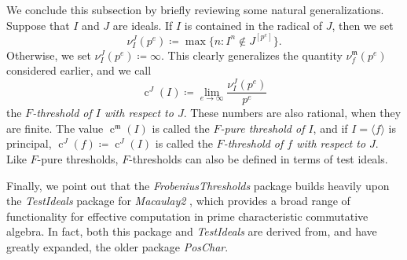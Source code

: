 \documentclass{amsart}
\newcommand{\ft}{\operatorname{c}}
\newcommand{\idealm}{\mathfrak{m}}
\begin{document}
We conclude this subsection by briefly reviewing some natural generalizations.  Suppose that $I$ and $J$ are ideals.  If $I$ is contained in the radical of $J$, then we set
%
\[ \nu_I^J(p^e) \coloneqq \max \{ n : I^n \notin J^{[p^e]} \}. \]
Otherwise, we set $\nu_I^J(p^e) \coloneqq \infty$.
This clearly generalizes the quantity $\nu_f^{\idealm}(p^e)$ considered earlier, and we call
\[ \ft^J(I) \coloneqq  \lim_{e \to \infty} \frac{ \nu_I^J(p^e)}{p^e} \]
the \emph{$F$-threshold of $I$ with respect to $J$}.  These numbers are also rational, when they are finite.
The value $\ft^{\idealm}(I)$ is called the \emph{$F$-pure threshold of $I$}, and if $I = \langle f \rangle$ is principal,  $\ft^{J}(f) \coloneqq  \ft^J(I)$ is called the \emph{$F$-threshold of $f$ with respect to $J$}.
Like $F$-pure thresholds, $F$-thresholds can also be defined in terms of test ideals.

Finally, we point out that the  \emph{FrobeniusThresholds} package builds heavily upon the \emph{TestIdeals} package for \emph{Macaulay2} \cite{TestIdealsPackage, TestIdealsPaper}, which provides a broad range of functionality for effective computation in prime characteristic commutative algebra.  In fact, both this package and \emph{TestIdeals} are derived from, and have greatly expanded, the older package \emph{PosChar}.



\end{document}

